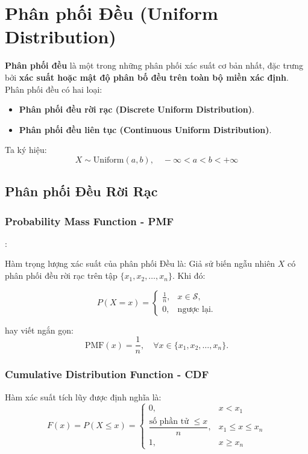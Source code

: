\section{Phân phối Đều (Uniform Distribution)}

\textbf{Phân phối đều} là một trong những phân phối xác suất cơ bản nhất, đặc trưng bởi \textbf{xác suất hoặc mật độ phân bố đều trên toàn bộ miền xác định}.  
Phân phối đều có hai loại:
\begin{itemize}
    \item \textbf{Phân phối đều rời rạc (Discrete Uniform Distribution)}.
    \item \textbf{Phân phối đều liên tục (Continuous Uniform Distribution)}.
\end{itemize}

Ta ký hiệu:
\[
X \sim \mathrm{Uniform}(a, b), \quad -\infty < a < b < +\infty
\]

\subsection{Phân phối Đều Rời Rạc}

\subsubsection{Probability Mass Function - PMF}:

Hàm trọng lượng xác suất của phân phối Đều là:
Giả sử biến ngẫu nhiên \( X \) có phân phối đều rời rạc trên tập \( \{x_1, x_2, \ldots, x_n\} \). Khi đó:

\[
P(X = x) =
\begin{cases}
\displaystyle \frac{1}{n}, & x \in \mathcal{S}, \\[1em]
0, & \text{ngược lại}.
\end{cases}
\]

hay viết ngắn gọn:
\[
\mathrm{PMF}(x) = \frac{1}{n}, \quad \forall x \in \{x_1, x_2, \ldots, x_n\}.
\]

\subsubsection{Cumulative Distribution Function - CDF}

Hàm xác suất tích lũy được định nghĩa là:
\[
F(x) = P(X \le x) =
\begin{cases}
0, & x < x_1 \\[0.5em]
\dfrac{\text{số phần tử } \le x}{n}, & x_1 \le x \le x_n \\[0.8em]
1, & x \ge x_n
\end{cases}
\]
  

